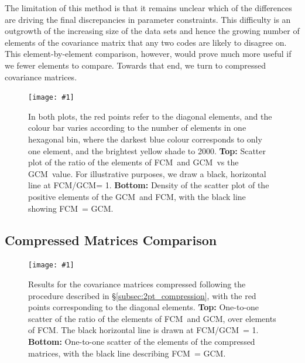 \documentclass[twocolumn]{\docclass}
\newcommand{\sfig}[2]{
	\texttt{[image: \#1]}
}
\newcommand{\Sfig}[2]{
	\begin{figure}[thbp]
		\sfig{../figures/#1.pdf}{\columnwidth}
		\caption{{\small #2}}
		\label{fig:#1}
	\end{figure}
}
\newcommand{\rssec}[1]{\S\ref{subsec:#1}}
\newcommand\full{FCM}
\newcommand\gaussian{GCM}
\begin{document}
	The limitation of this method is that it remains unclear which of the differences are driving the final discrepancies in parameter constraints. This difficulty is an outgrowth of the increasing size of the data sets and hence the growing number of elements of the covariance matrix that any two codes are likely to disagree on. This element-by-element comparison, however, would prove much more useful if we fewer elements to compare. Towards that end, we turn to compressed covariance matrices.
	
	\Sfig{Y1-scatter}{In both plots, the red points refer to the diagonal elements, and the colour bar varies according to the number of elements in one hexagonal bin, where the darkest blue colour corresponds to only one element, and the brightest yellow shade to 2000. \textbf{Top:} Scatter plot of the ratio of the elements of \full\ and \gaussian\ vs the \gaussian\ value. For illustrative purposes, we draw a black, horizontal line at \full/\gaussian = 1. \textbf{Bottom:} Density of the scatter plot of the positive elements of the \gaussian\ and \full, with the black line showing \full\ = \gaussian.}
	
	\subsection{Compressed Matrices Comparison}
	\label{subsec:compare_compressed}
	
	
	\begin{figure}[b]
		\sfig{Comp2pt-scatter}{0.85\columnwidth}
		\caption{{\small Results for the covariance matrices compressed following the procedure described in \rssec{2pt_compression}, with the red points corresponding to the diagonal elements.
				\textbf{Top:}  One-to-one scatter of the ratio of the elements of \full\ and \gaussian, over elements of \full. The black horizontal line is drawn at \full/\gaussian\ = 1.
				\textbf{Bottom:}  One-to-one scatter of the elements of the compressed matrices, with the black line describing \full\ = \gaussian.}}
		\label{fig:Comp2pt-scatter}
	\end{figure}
	
\end{document}

